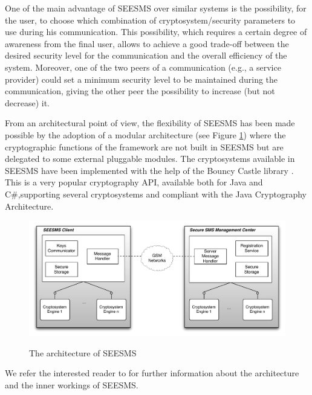 \documentclass[authoryear]{elsarticle}
\begin{document}
One of the main advantage of SEESMS over similar systems is the possibility, for the user, to choose which combination of cryptosystem/security parameters to use during his communication. This possibility, which requires a certain degree of awareness from the final user, allows to achieve a good trade-off between the desired security level for the communication and the overall efficiency of the system. Moreover, one of the two peers of a communication (e.g., a service provider) could set a minimum security level to be maintained during the communication, giving the other peer the possibility to increase (but not decrease) it. 


From an architectural point of view, the flexibility of SEESMS has been made possible by the adoption of a modular architecture (see Figure \ref{fig:arch}) where the cryptographic functions of the framework are not built in SEESMS but are delegated to some external pluggable modules.  The cryptosystems available in SEESMS have been implemented with the help of the Bouncy Castle library \citet{Bouncy}. This is a very popular cryptography API, available both for Java and C\#,supporting several cryptosystems and compliant with the Java Cryptography Architecture. 

\begin{figure}[ht]
\begin{center}
  \includegraphics[width=12cm]{immagini/archJwhisper.pdf}\\
  \caption{The architecture of SEESMS}
  \label{fig:arch}
\end{center}
\end{figure}

We refer the interested reader to  \cite{DeSantis2010} for further information about the architecture and the inner workings of SEESMS.
\end{document}
